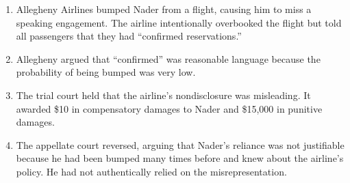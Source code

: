 \begin{enumerate}
    \item Allegheny Airlines bumped Nader from a flight, causing him to miss a 
    speaking engagement. The airline intentionally overbooked the flight but 
    told all passengers that they had ``confirmed reservations.''
    \item Allegheny argued that ``confirmed'' was reasonable language because 
    the probability of being bumped was very low.
    \item The trial court held that the airline's nondisclosure was 
    misleading. It awarded \$10 in compensatory damages to Nader and \$15,000 
    in punitive damages.
    \item The appellate court reversed, arguing that Nader's reliance was not 
    justifiable because he had been bumped many times before and knew about 
    the airline's policy. He had not authentically relied on the 
    misrepresentation.
\end{enumerate}
